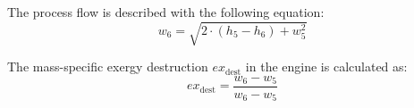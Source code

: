 The process flow is described with the following equation:  
\[
w_6 = \sqrt{2 \cdot \left( h_5 - h_6 \right) + w_5^2}
\]

The mass-specific exergy destruction \( ex_{\text{dest}} \) in the engine is calculated as:  
\[
ex_{\text{dest}} = \frac{w_6 - w_5}{w_6 - w_5}
\]